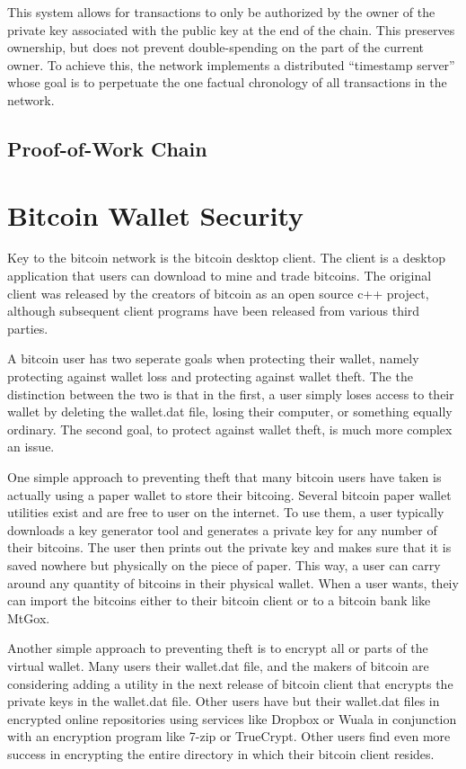 \documentclass{report}
\begin{document}
    This system allows for transactions to only be authorized by the owner of the private key associated with the public key at the end of the chain. This preserves ownership, but does not prevent double-spending on the part of the current owner. To achieve this, the network implements a distributed ``timestamp server'' whose goal is to perpetuate the one factual chronology of all transactions in the network.

  \subsection*{Proof-of-Work Chain}
    

\section*{Bitcoin Wallet Security}
Key to the bitcoin network is the bitcoin desktop client.  The client is a desktop
application that users can download to mine and trade bitcoins.  The original client
was released by the creators of bitcoin as an open source c++ project\cite{Andresen:source}, although
subsequent client programs have been released from various third parties.  

A bitcoin user has two seperate goals when protecting their wallet, namely protecting
against wallet loss and protecting against wallet theft.  The the distinction between 
the two is that in the first, a user simply loses access to their wallet by deleting 
the wallet.dat file, losing their computer, or something equally ordinary.  The second 
goal, to protect against wallet theft, is much more complex an issue.

One simple approach to preventing theft that many bitcoin users have taken is actually 
using a paper wallet to store their bitcoing.  Several bitcoin paper wallet utilities 
exist and are free to user on the internet.  To use them, a user typically downloads a 
key generator tool and generates a private key for any number of their bitcoins.  The 
user then prints out the private key and makes sure that it is saved nowhere but 
physically on the piece of paper.  This way, a user can carry around any quantity of 
bitcoins in their physical wallet.  When a user wants, theiy can import the bitcoins 
either to their bitcoin client or to a bitcoin bank like MtGox.

Another simple approach to preventing theft is to encrypt all or parts of the virtual 
wallet.  Many users their wallet.dat file, and the makers of bitcoin are considering 
adding a utility in the next release of bitcoin client that encrypts the private keys 
in the wallet.dat file.  Other users have but their wallet.dat files in encrypted online 
repositories using services like Dropbox or Wuala in conjunction with an encryption 
program like 7-zip or TrueCrypt.  Other users find even more success in encrypting the 
entire directory in which their bitcoin client resides.
\end{document}
